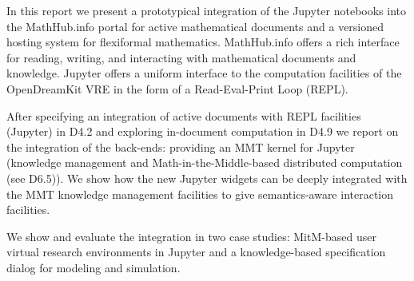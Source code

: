
In this report we present a prototypical integration of the Jupyter notebooks into the MathHub.info portal for active mathematical documents and a versioned hosting system for flexiformal mathematics.
MathHub.info offers a rich interface for reading, writing, and interacting with mathematical documents and knowledge.
Jupyter offers a uniform interface to the computation facilities of the OpenDreamKit VRE in the form of a Read-Eval-Print Loop (REPL). 

After specifying an integration of active documents with REPL facilities (Jupyter) in D4.2 and exploring in-document computation in D4.9 we report on the integration of the back-ends: providing an MMT kernel for Jupyter (knowledge management and Math-in-the-Middle-based distributed computation (see D6.5)).
We show how the new Jupyter widgets can be deeply integrated with the MMT knowledge management facilities to give semantics-aware interaction facilities.

We show and evaluate the integration in two case studies: MitM-based user virtual research environments in Jupyter and a knowledge-based specification dialog for modeling and simulation. 


